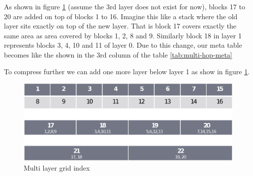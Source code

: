 {As shown in figure \ref{fig:multi-grid2} (assume the 3rd layer does not exist for now), blocks 17 to 20 are added on top of blocks 1 to 16. Imagine this like a stack where the old layer sits exactly on top of the new layer. That is block 17 covers exactly the same area as area covered by blocks 1, 2, 8 and 9. Similarly block 18 in layer 1 represents blocks 3, 4, 10 and 11 of layer 0. Due to this change, our meta table becomes like the shown in the 3rd column of the table \ref{tab:multi-hop-meta}


{To compress further we can add one more layer below layer 1 as show in figure \ref{fig:multi-grid2}.}

\begin{figure}[h]
    \centering
    \includegraphics[width=0.8\linewidth]{images/image06.eps}
    \caption{Multi layer grid index}
    \label{fig:multi-grid2}
\end{figure}

}
